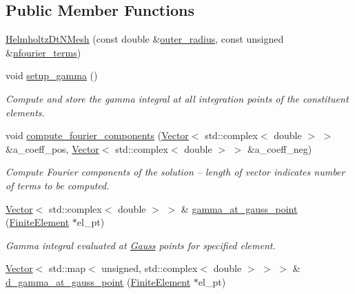 \subsection*{Public Member Functions}
\begin{DoxyCompactItemize}
\item 
\hyperlink{classoomph_1_1HelmholtzDtNMesh_ae08e8842a44a5082b1d77634a9392b5f}{Helmholtz\+Dt\+N\+Mesh} (const double \&\hyperlink{classoomph_1_1HelmholtzDtNMesh_af7dc865c8a17b22ac3fbe2fe8573b80d}{outer\+\_\+radius}, const unsigned \&\hyperlink{classoomph_1_1HelmholtzDtNMesh_a7d71342179243a29a3b145a975e3d41e}{nfourier\+\_\+terms})
\item 
void \hyperlink{classoomph_1_1HelmholtzDtNMesh_a6ff3552cd1d0ba3f29b4fe951e3f0ed5}{setup\+\_\+gamma} ()
\begin{DoxyCompactList}\small\item\em Compute and store the gamma integral at all integration points of the constituent elements. \end{DoxyCompactList}\item 
void \hyperlink{classoomph_1_1HelmholtzDtNMesh_a7b3f84cb23c80fe71014d9079f925397}{compute\+\_\+fourier\+\_\+components} (\hyperlink{classoomph_1_1Vector}{Vector}$<$ std\+::complex$<$ double $>$ $>$ \&a\+\_\+coeff\+\_\+pos, \hyperlink{classoomph_1_1Vector}{Vector}$<$ std\+::complex$<$ double $>$ $>$ \&a\+\_\+coeff\+\_\+neg)
\begin{DoxyCompactList}\small\item\em Compute Fourier components of the solution -- length of vector indicates number of terms to be computed. \end{DoxyCompactList}\item 
\hyperlink{classoomph_1_1Vector}{Vector}$<$ std\+::complex$<$ double $>$ $>$ \& \hyperlink{classoomph_1_1HelmholtzDtNMesh_a5750130241285c015fd4da6f1bc89a39}{gamma\+\_\+at\+\_\+gauss\+\_\+point} (\hyperlink{classoomph_1_1FiniteElement}{Finite\+Element} $\ast$el\+\_\+pt)
\begin{DoxyCompactList}\small\item\em Gamma integral evaluated at \hyperlink{classoomph_1_1Gauss}{Gauss} points for specified element. \end{DoxyCompactList}\item 
\hyperlink{classoomph_1_1Vector}{Vector}$<$ std\+::map$<$ unsigned, std\+::complex$<$ double $>$ $>$ $>$ \& \hyperlink{classoomph_1_1HelmholtzDtNMesh_a93099b5a0811f5638f8dff7186c14dfb}{d\+\_\+gamma\+\_\+at\+\_\+gauss\+\_\+point} (\hyperlink{classoomph_1_1FiniteElement}{Finite\+Element} $\ast$el\+\_\+pt)

\end{DoxyCompactItemize}
